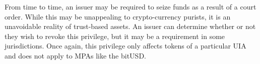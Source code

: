 From time to time, an issuer may be required to seize funds as a result of a
court order. While this may be unappealing to crypto-currency purists, it is an
unavoidable reality of trust-based assets. An issuer can determine whether or
not they wish to revoke this privilege, but it may be a requirement in some
jurisdictions. Once again, this privilege only affects tokens of a particular
UIA and does not apply to MPAs like the bitUSD.
